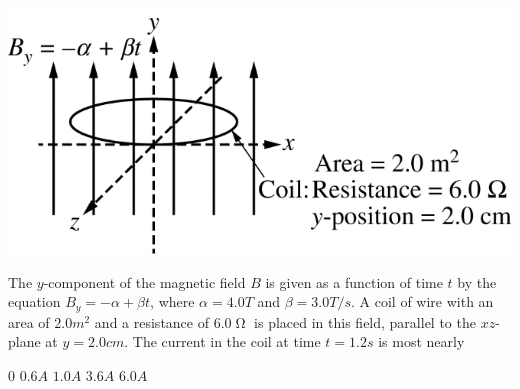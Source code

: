 
\begin{center}
    \includegraphics[scale=0.4]{images/img-005-008.png}
\end{center}

\begin{questions}
\setcounter{question}{5}

\question
The $y$-component of the magnetic field $B$ is given as a function of time $t$ by the equation $B_{y}=-\alpha+\beta t$, where $\alpha=4.0 \unit{T}$ and $\beta=3.0 \unit{T/s}$. A coil of wire with an area of $2.0 \unit{m^2}$ and a resistance of $6.0\mathop{\Omega}$ is placed in this field, parallel to the $xz$-plane at $y=2.0 \unit{cm}$. The current in the coil at time $t=1.2 \unit{s}$ is most nearly

\begin{oneparchoices}
    \choice $0$
    \choice $0.6\unit{A}$
    \choice $1.0\unit{A}$
    \choice $3.6\unit{A}$
    \choice $6.0\unit{A}$
\end{oneparchoices}

\end{questions}
